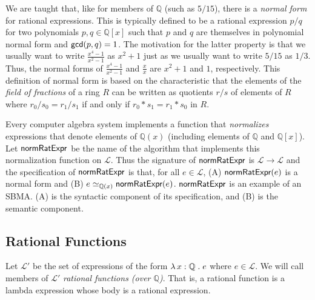 \documentclass[fleqn]{llncs}
\newcommand{\QQ}{\ensuremath{\mathbb{Q}}}
\newcommand{\NRE}{\ensuremath{\mname{normRatExpr}}}
\newcommand{\Lang}{\ensuremath{\mathcal{L}}}
\newcommand{\Langp}{\ensuremath{\mathcal{L}'}}
\begin{document}
We are taught that, like for members of $\QQ$ (such as $5/15$), there
is a \emph{normal form} for rational expressions. This is typically
defined to be a rational expression $p/q$ for two polynomials $p,q \in \QQ[x]$
such that $p$ and $q$ are themselves in polynomial normal form and
$\mbox{\sf gcd}(p,q) = 1$.  The motivation for the latter
property is that we usually want to write $\frac{x^4-1}{x^2-1}$ as
$x^2 + 1$ just as we usually want to write $5/15$ as $1/3$.  Thus, the
normal forms of $\frac{x^4-1}{x^2-1}$ and $\frac{x}{x}$ are $x^2 + 1$
and $1$, respectively.  This definition of normal form is based on the
characteristic that the elements of the \emph{field of fractions} of a
ring $R$ can be written as quotients $r/s$ of elements of $R$ where
$r_0/s_0 = r_1/s_1$ if and only if $r_0 * s_1 = r_1 * s_0$ in $R$.

Every computer algebra system implements a function that
\emph{normalizes} expressions that denote elements of $\QQ(x)$
(including elements of $\QQ$ and $\QQ[x]$).  
Let {\NRE} be the name of
the algorithm that implements this normalization function on $\Lang$.
Thus the signature of $\NRE$ is $\Lang \rightarrow \Lang$ and the
specification of $\NRE$ is that, for all $e \in \Lang$, (A) $\NRE(e)$
is a normal form and (B) $e \simeq_{\QQ(x)} \NRE(e)$.  $\NRE$ is an
example of an SBMA.  (A) is the syntactic component of its
specification, and (B) is the semantic component.

\subsection{Rational Functions}

Let $\Langp$ be the set of expressions of the form $\LambdaApp x : \QQ
\mdot e$ where $e \in \Lang$.  We will call members of $\Langp$
\emph{rational functions (over $\QQ$)}.  That is, a rational function
is a lambda expression whose body is a rational expression.  
\end{document}
